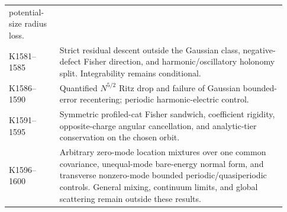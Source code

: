\begin{longtable}{>{\raggedright\arraybackslash}p{0.17\linewidth}>{\raggedright\arraybackslash}p{0.76\linewidth}}
potential-size radius loss.\\
K1581--1585 & Strict residual descent outside the Gaussian class,
negative-defect Fisher direction, and harmonic/oscillatory holonomy split.
Integrability remains conditional.\\
K1586--1590 & Quantified $N^{5/2}$ Ritz drop and failure of Gaussian
bounded-error recentering; periodic harmonic-electric control.\\
K1591--1595 & Symmetric profiled-cat Fisher sandwich,
coefficient rigidity, opposite-charge angular cancellation, and analytic-tier
conservation on the chosen orbit.\\
K1596--1600 & Arbitrary zero-mode location mixtures over one common
covariance, unequal-mode bare-energy normal form, and transverse nonzero-mode
bounded periodic/quasiperiodic controls. General mixing, continuum limits,
and global scattering remain outside these results.\\
\end{longtable}
\endgroup
